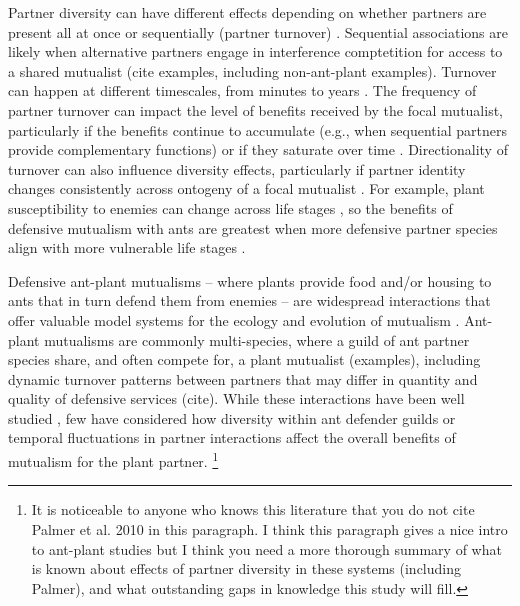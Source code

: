 \documentclass[11pt]{article}
\begin{document}
Partner diversity can have different effects depending on whether partners are present all at once or sequentially (partner turnover) \citep{Djieto-Lordon2005, Ness2006, Bruna2014}. 
Sequential associations are likely when alternative partners engage in interference comptetition for access to a shared mutualist (cite examples, including non-ant-plant examples). 
Turnover can happen at different timescales, from minutes to years \citep{Oliveira1999,Horvitz1986}. 
The frequency of partner turnover can impact the level of benefits received by the focal mutualist, particularly if the benefits continue to accumulate (e.g., when sequential partners provide complementary functions) or if they saturate over time \citep{Sachs2004}.
Directionality of turnover can also influence diversity effects, particularly if partner identity changes consistently across ontogeny of a focal mutualist \citep{Fonseca2003}.
For example, plant susceptibility to enemies can change across life stages \citep{Boege2005,Barton2010}, so the benefits of defensive mutualism with ants are greatest when more defensive partner species align with more vulnerable life stages \citep{Djieto-Lordon2005}.

Defensive ant-plant mutualisms -- where plants provide food and/or housing to ants that in turn defend them from enemies -- are widespread interactions that offer valuable model systems for the ecology and evolution of mutualism \citep{Bronstein1998, Bronstein2006}. 
Ant-plant mutualisms are commonly multi-species, where a guild of ant partner species share, and often compete for, a plant mutualist (examples), including dynamic turnover patterns between partners that may differ in quantity and quality of defensive services (cite). 
While these interactions have been well studied \citep{Ness2006,Beattie1985,Schultheiss2022}, few have considered how diversity within ant defender guilds \citep{Stanton2013} or temporal fluctuations in partner interactions \citep{Tgaard2015} affect the overall benefits of mutualism for the plant partner. \footnote{It is noticeable to anyone who knows this literature that you do not cite Palmer et al. 2010 in this paragraph. I think this paragraph gives a nice intro to ant-plant studies but I think you need a more thorough summary of what is known about effects of partner diversity in these systems (including Palmer), and what outstanding gaps in knowledge this study will fill.}
\end{document}
